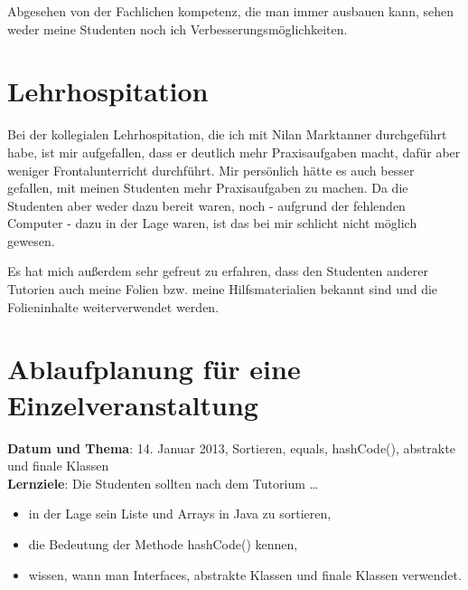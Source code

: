 \documentclass[a4paper,12pt]{article}
\begin{document}
Abgesehen von der Fachlichen kompetenz, die man immer ausbauen kann,
sehen weder meine Studenten noch ich Verbesserungsmöglichkeiten.

\section*{Lehrhospitation}
Bei der kollegialen Lehrhospitation, die ich mit Nilan Marktanner
durchgeführt habe, ist mir aufgefallen, dass er deutlich mehr 
Praxisaufgaben macht, dafür aber weniger Frontalunterricht durchführt.
Mir persönlich hätte es auch besser gefallen, mit meinen Studenten 
mehr Praxisaufgaben zu machen. Da die Studenten aber weder dazu 
bereit waren, noch - aufgrund der fehlenden Computer - dazu in der
Lage waren, ist das bei mir schlicht nicht möglich gewesen.

Es hat mich außerdem sehr gefreut zu erfahren, dass den Studenten
anderer Tutorien auch meine Folien bzw. meine Hilfsmaterialien 
bekannt sind und die Folieninhalte weiterverwendet werden.

\clearpage
\section*{Ablaufplanung für eine Einzelveranstaltung}
\textbf{Datum und Thema}: 14. Januar 2013, Sortieren, equals, 
hashCode(), abstrakte und finale Klassen\\
\textbf{Lernziele}: Die Studenten sollten nach dem Tutorium \dots
\begin{itemize} 
    \item in der Lage sein Liste und Arrays in Java zu sortieren,
    \item die Bedeutung der Methode hashCode() kennen,
    \item wissen, wann man Interfaces, abstrakte Klassen und finale 
          Klassen verwendet.
\end{itemize}
\end{document}
